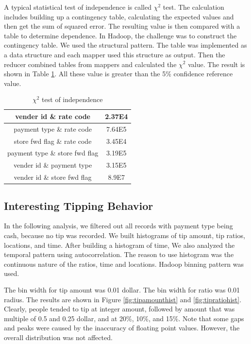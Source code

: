 \documentclass[12pt,a4paper]{article}
\begin{document}
  A typical statistical test of independence is called $\chi^2$ test. The calculation includes building up a contingency table, calculating the expected values and then get the sum of squared error\cite{chisqwebsite}. The resulting value is then compared with a table to determine dependence. In Hadoop, the challenge was to construct the contingency table. We used the structural pattern. The table was implemented as a data structure and each mapper used this structure as output. Then the reducer combined tables from mappers and calculated the $\chi^2$ value. The result is shown in Table \ref{tab:chisq}. All these value is greater than the 5\% confidence reference value. 
  \begin{table}[h]
    \center
    \caption{$\chi^2$ test of independence}
    \label{tab:chisq}
    \begin{tabular}{|c|c|}\hline
      vender id \& rate code	& 2.37E4 \\ \hline
      payment type \& rate code	& 7.64E5 \\ \hline
      store fwd flag \& rate code	& 3.45E4 \\ \hline
      payment type \& store fwd flag	& 3.19E5 \\ \hline
      vender id \& payment type	& 3.15E5 \\ \hline
      vender id \& store fwd flag	& 8.9E7 \\ \hline
    \end{tabular}
  \end{table}

  \subsection{Interesting Tipping Behavior}
  \label{sec:freqamounts}
  \label{sec:freqratios}
  In the following analysis, we filtered out all records with payment type being cash, because no tip was recorded. We built histograms of tip amount, tip ratios, locations, and time. After building a histogram of time, We also analyzed the temporal pattern using autocorrelation. The reason to use histogram was the continuous nature of the ratios, time and locations. Hadoop binning pattern was used.

  The bin width for tip amount was 0.01 dollar. The bin width for ratio was 0.01 radius. The results are shown in Figure \ref{fig:tipamounthist} and \ref{fig:tipratiohist}. Clearly, people tended to tip at integer amount, followed by amount that was multiple of 0.5 and 0.25 dollar, and at 20\%, 10\%, and 15\%. Note that some gaps and peaks were caused by the inaccuracy of floating point values. However, the overall distribution was not affected.
\end{document}
